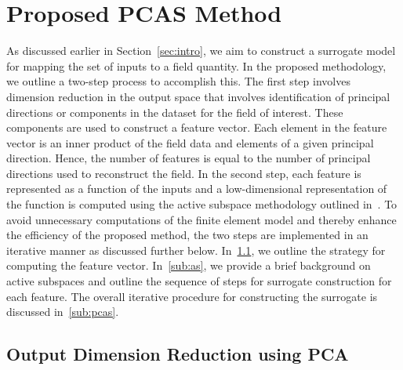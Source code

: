 \section{Proposed PCAS Method}
\label{sec:method}

As discussed earlier in Section~\ref{sec:intro}, we aim to construct a surrogate model for mapping the set of inputs to a
field quantity. In the proposed methodology, we outline a two-step process to accomplish this. The first step involves
dimension reduction in the output space that involves
identification of principal directions or components in the dataset for the field of interest. These components are used
to construct a feature vector. Each element in the feature vector is an inner product of the field data and elements
of a given principal direction. Hence, the number of features is equal to the number of principal directions used to
reconstruct the field. In the second step, each feature is represented as a function of the inputs and a low-dimensional
representation of the function is computed
using the active subspace methodology outlined in~\cite{Constantine:2015}. 
To avoid unnecessary computations of the finite element model and thereby enhance the efficiency of the proposed method,
the two steps are implemented in an iterative manner as discussed further below. 
In~\ref{sub:pca}, we outline
the strategy for computing the feature vector. In~\ref{sub:as}, we provide a brief background on active subspaces
and outline the sequence of steps for surrogate construction for each feature. The overall iterative procedure for
constructing the surrogate is discussed in~\ref{sub:pcas}.

\subsection{Output Dimension Reduction using PCA}
\label{sub:pca}

